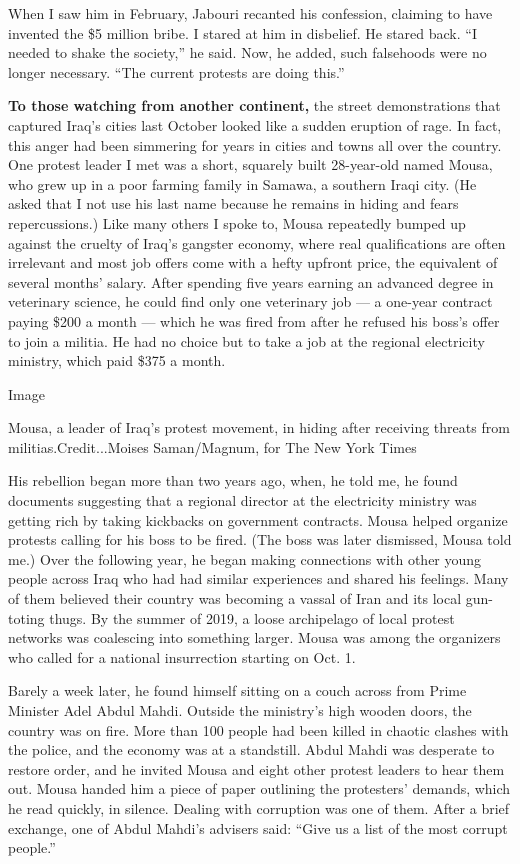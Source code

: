 When I saw him in February, Jabouri recanted his confession, claiming to
have invented the \$5 million bribe. I stared at him in disbelief. He
stared back. ``I needed to shake the society,'' he said. Now, he added,
such falsehoods were no longer necessary. ``The current protests are
doing this.''

\textbf{To those watching from another continent,} the street
demonstrations that captured Iraq's cities last October looked like a
sudden eruption of rage. In fact, this anger had been simmering for
years in cities and towns all over the country. One protest leader I met
was a short, squarely built 28-year-old named Mousa, who grew up in a
poor farming family in Samawa, a southern Iraqi city. (He asked that I
not use his last name because he remains in hiding and fears
repercussions.) Like many others I spoke to, Mousa repeatedly bumped up
against the cruelty of Iraq's gangster economy, where real
qualifications are often irrelevant and most job offers come with a
hefty upfront price, the equivalent of several months' salary. After
spending five years earning an advanced degree in veterinary science, he
could find only one veterinary job --- a one-year contract paying \$200
a month --- which he was fired from after he refused his boss's offer to
join a militia. He had no choice but to take a job at the regional
electricity ministry, which paid \$375 a month.

Image

Mousa, a leader of Iraq's protest movement, in hiding after receiving
threats from militias.Credit...Moises Saman/Magnum, for The New York
Times

His rebellion began more than two years ago, when, he told me, he found
documents suggesting that a regional director at the electricity
ministry was getting rich by taking kickbacks on government contracts.
Mousa helped organize protests calling for his boss to be fired. (The
boss was later dismissed, Mousa told me.) Over the following year, he
began making connections with other young people across Iraq who had had
similar experiences and shared his feelings. Many of them believed their
country was becoming a vassal of Iran and its local gun-toting thugs. By
the summer of 2019, a loose archipelago of local protest networks was
coalescing into something larger. Mousa was among the organizers who
called for a national insurrection starting on Oct. 1.

Barely a week later, he found himself sitting on a couch across from
Prime Minister Adel Abdul Mahdi. Outside the ministry's high wooden
doors, the country was on fire. More than 100 people had been killed in
chaotic clashes with the police, and the economy was at a standstill.
Abdul Mahdi was desperate to restore order, and he invited Mousa and
eight other protest leaders to hear them out. Mousa handed him a piece
of paper outlining the protesters' demands, which he read quickly, in
silence. Dealing with corruption was one of them. After a brief
exchange, one of Abdul Mahdi's advisers said: ``Give us a list of the
most corrupt people.''

